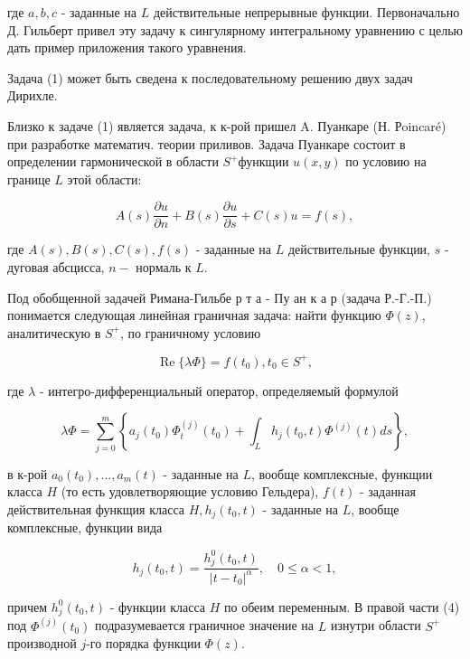 \documentclass[10pt]{article}
\begin{document}
где $a, b, c$ - заданные на $L$ действительные непрерывные функции. Первоначально Д. Гильберт привел эту задачу к сингулярному интегральному уравнению с целью дать пример приложения такого уравнения.



Задача (1) может быть сведена к последовательному решению двух задач Дирихле.



Близко к задаче (1) является задача, к к-рой пришел A. Пуанкаре (Н. Рoincaré) при разработке математич. теории приливов. Задача Пуанкаре состоит в определении гармонической в области $S^{+}$функщии $u(x, y)$ по условию на границе $L$ этой области:



\[

A(s) \frac{\partial u}{\partial n}+B(s) \frac{\partial u}{\partial s}+C(s) u=f(s),

\]



где $A(s), B(s), C(s), f(s)$ - заданные на $L$ действительные функции, $s$ - дуговая абсцисса, $n-$ нормаль к $L$.



Под обобщенной задачей Римана-Гильбе р т а - Пу ан к а р (задача Р.-Г.-П.) понимается следующая линейная граничная задача: найти функцию $\Phi(z)$, аналитическую в $S^{+}$, по граничному условию



\[

\operatorname{Re}\{\lambda \Phi\}=f\left(t_{0}\right), t_{0} \in S^{+},

\]



где $\lambda$ - интегро-дифференциальный оператор, определяемый формулой



\[

\lambda \Phi=\sum_{j=0}^{m}\left\{a_{j}\left(t_{0}\right) \Phi_{t}^{(j)}\left(t_{0}\right)+\int_{L} h_{j}\left(t_{0}, t\right) \Phi^{(j)}(t) d s\right\},

\]



в к-рой $a_{0}\left(t_{0}\right), \ldots, a_{m}(t)$ - заданные на $L$, вообще комплексные, функщии класса $H$ (то есть удовлетворяющие условию Гельдера), $f(t)$ - заданная действительная функщия класса $H, h_{j}\left(t_{0}, t\right)$ - заданные на $L$, вообще комплексные, функции вида



\[

h_{j}\left(t_{0}, t\right)=\frac{h_{j}^{0}\left(t_{0}, t\right)}{\left|t-t_{0}\right|^{\alpha}}, \quad 0 \leqslant \alpha<1,

\]



причем $h_{j}^{0}\left(t_{0}, t\right)$ - функции класса $H$ по обеим переменным. В правой части (4) под $\Phi^{(j)}\left(t_{0}\right)$ подразумевается граничное значение на $L$ изнутри области $S^{+}$производной $j$-го порядка функции $\Phi(z)$.
\end{document}
